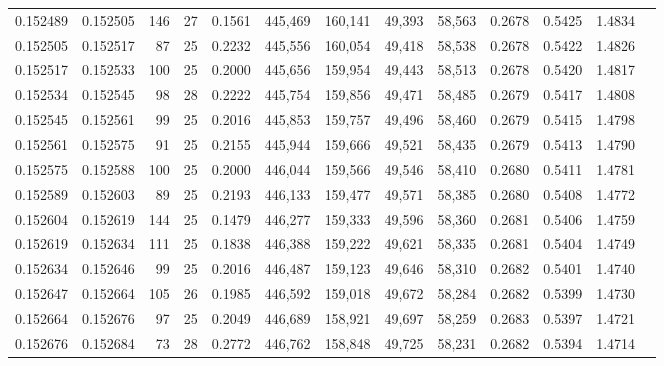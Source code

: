 \begin{tabular}{rrrrrrrrrrrrr}
0.152489 & 0.152505 &   146 &  27 &                                     0.1561 & 445,469 & 160,141 &  49,393 &  58,563 & 0.2678 & 0.5425 & 1.4834 \\
0.152505 & 0.152517 &    87 &  25 &                                     0.2232 & 445,556 & 160,054 &  49,418 &  58,538 & 0.2678 & 0.5422 & 1.4826 \\
0.152517 & 0.152533 &   100 &  25 &                                     0.2000 & 445,656 & 159,954 &  49,443 &  58,513 & 0.2678 & 0.5420 & 1.4817 \\
0.152534 & 0.152545 &    98 &  28 &                                     0.2222 & 445,754 & 159,856 &  49,471 &  58,485 & 0.2679 & 0.5417 & 1.4808 \\
0.152545 & 0.152561 &    99 &  25 &                                     0.2016 & 445,853 & 159,757 &  49,496 &  58,460 & 0.2679 & 0.5415 & 1.4798 \\
0.152561 & 0.152575 &    91 &  25 &                                     0.2155 & 445,944 & 159,666 &  49,521 &  58,435 & 0.2679 & 0.5413 & 1.4790 \\
0.152575 & 0.152588 &   100 &  25 &                                     0.2000 & 446,044 & 159,566 &  49,546 &  58,410 & 0.2680 & 0.5411 & 1.4781 \\
0.152589 & 0.152603 &    89 &  25 &                                     0.2193 & 446,133 & 159,477 &  49,571 &  58,385 & 0.2680 & 0.5408 & 1.4772 \\
0.152604 & 0.152619 &   144 &  25 &                                     0.1479 & 446,277 & 159,333 &  49,596 &  58,360 & 0.2681 & 0.5406 & 1.4759 \\
0.152619 & 0.152634 &   111 &  25 &                                     0.1838 & 446,388 & 159,222 &  49,621 &  58,335 & 0.2681 & 0.5404 & 1.4749 \\
0.152634 & 0.152646 &    99 &  25 &                                     0.2016 & 446,487 & 159,123 &  49,646 &  58,310 & 0.2682 & 0.5401 & 1.4740 \\
0.152647 & 0.152664 &   105 &  26 &                                     0.1985 & 446,592 & 159,018 &  49,672 &  58,284 & 0.2682 & 0.5399 & 1.4730 \\
0.152664 & 0.152676 &    97 &  25 &                                     0.2049 & 446,689 & 158,921 &  49,697 &  58,259 & 0.2683 & 0.5397 & 1.4721 \\
0.152676 & 0.152684 &    73 &  28 &                                     0.2772 & 446,762 & 158,848 &  49,725 &  58,231 & 0.2682 & 0.5394 & 1.4714 \\

\end{tabular}
